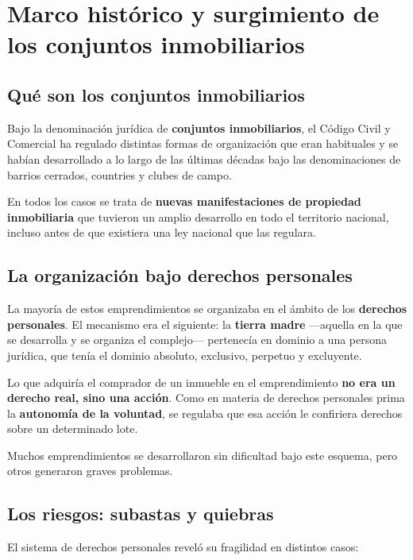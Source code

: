 \documentclass[12pt,oneside]{book}
\begin{document}
\chapter[Marco histórico]{Marco histórico y surgimiento de los conjuntos inmobiliarios}

\section{Qué son los conjuntos inmobiliarios}

Bajo la denominación jurídica de \textbf{conjuntos inmobiliarios}, el Código Civil y Comercial ha regulado distintas formas de organización que eran habituales y se habían desarrollado a lo largo de las últimas décadas bajo las denominaciones de barrios cerrados, countries y clubes de campo.

En todos los casos se trata de \textbf{nuevas manifestaciones de propiedad inmobiliaria} que tuvieron un amplio desarrollo en todo el territorio nacional, incluso antes de que existiera una ley nacional que las regulara.

\section{La organización bajo derechos personales}

La mayoría de estos emprendimientos se organizaba en el ámbito de los \textbf{derechos personales}. El mecanismo era el siguiente: la \textbf{tierra madre} ---aquella en la que se desarrolla y se organiza el complejo--- pertenecía en dominio a una persona jurídica, que tenía el dominio absoluto, exclusivo, perpetuo y excluyente.

Lo que adquiría el comprador de un inmueble en el emprendimiento \textbf{no era un derecho real, sino una acción}. Como en materia de derechos personales prima la \textbf{autonomía de la voluntad}, se regulaba que esa acción le confiriera derechos sobre un determinado lote.

Muchos emprendimientos se desarrollaron sin dificultad bajo este esquema, pero otros generaron graves problemas.

\section{Los riesgos: subastas y quiebras}

El sistema de derechos personales reveló su fragilidad en distintos casos:
\end{document}
